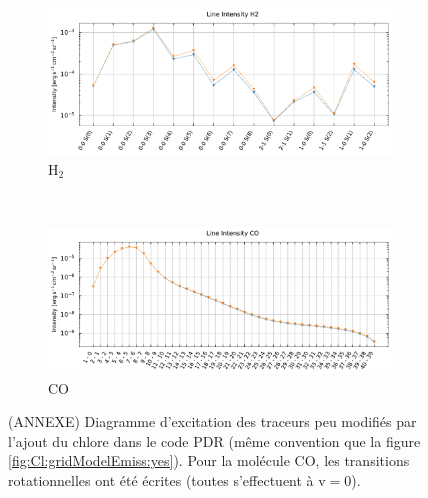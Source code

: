 \begin{appendices}
\begin{figure}[!h]
    \begin{subfigure}[t]{0.49\textwidth} %
        \centering \includegraphics[trim = {0 0 0 1cm},clip,width=1\textwidth]{figure/Cl/gridModelEmiss/I_comp_H2.pdf}
        \caption{$\mathrm{H}_2$}
    \end{subfigure}
    ~ 
    \begin{subfigure}[t]{0.49\textwidth} %
        \centering \includegraphics[trim = {0 0 0 1cm},clip,width=1\textwidth]{figure/Cl/gridModelEmiss/I_comp_CO.pdf}
        \caption{$\mathrm{CO}$}
    \end{subfigure}
    
    \caption{(ANNEXE) Diagramme d'excitation des traceurs peu modifiés par l'ajout du chlore dans le code PDR (même convention que la figure \ref{fig:Cl:gridModelEmiss:yes}). Pour la molécule $\mathrm{CO}$, les transitions rotationnelles ont été écrites (toutes s'effectuent à $\mathrm{v}=0$).}
    \label{fig:Cl:gridModelEmiss:no}
\end{figure}


\clearpage

\end{appendices}
